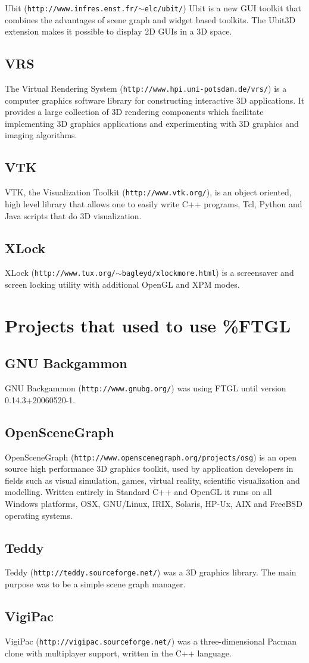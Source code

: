 Ubit ({\tt http://www.infres.enst.fr/$\sim$elc/ubit/}) Ubit is a new GUI toolkit that combines the advantages of scene graph and widget based toolkits. The Ubit3D extension makes it possible to display 2D GUIs in a 3D space.\subsection{VRS}\label{ftgl-projects_vrs}
The Virtual Rendering System ({\tt http://www.hpi.uni-potsdam.de/vrs/}) is a computer graphics software library for constructing interactive 3D applications. It provides a large collection of 3D rendering components which facilitate implementing 3D graphics applications and experimenting with 3D graphics and imaging algorithms.\subsection{VTK}\label{ftgl-projects_vtk}
VTK, the Visualization Toolkit ({\tt http://www.vtk.org/}), is an object oriented, high level library that allows one to easily write C++ programs, Tcl, Python and Java scripts that do 3D visualization.\subsection{XLock}\label{ftgl-projects_xlock}
XLock ({\tt http://www.tux.org/$\sim$bagleyd/xlockmore.html}) is a screensaver and screen locking utility with additional OpenGL and XPM modes.\section{Projects that used to use \%FTGL}\label{ftgl-projects_old}
\subsection{GNU Backgammon}\label{ftgl-projects_gnubg}
GNU Backgammon ({\tt http://www.gnubg.org/}) was using FTGL until version 0.14.3+20060520-1.\subsection{OpenSceneGraph}\label{ftgl-projects_openscenegraph}
OpenSceneGraph ({\tt http://www.openscenegraph.org/projects/osg}) is an open source high performance 3D graphics toolkit, used by application developers in fields such as visual simulation, games, virtual reality, scientific visualization and modelling. Written entirely in Standard C++ and OpenGL it runs on all Windows platforms, OSX, GNU/Linux, IRIX, Solaris, HP-Ux, AIX and FreeBSD operating systems.\subsection{Teddy}\label{ftgl-projects_teddy}
Teddy ({\tt http://teddy.sourceforge.net/}) was a 3D graphics library. The main purpose was to be a simple scene graph manager.\subsection{VigiPac}\label{ftgl-projects_vigipac}
VigiPac ({\tt http://vigipac.sourceforge.net/}) was a three-dimensional Pacman clone with multiplayer support, written in the C++ language. 
